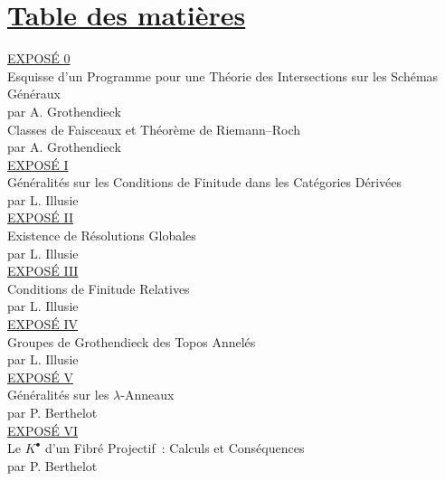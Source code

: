 \section*{\underline{Table des matières}}

\noindent
\underline{EXPOSÉ 0}\\
Esquisse d'un Programme pour une Théorie des Intersections sur les Schémas Généraux\\
par A. Grothendieck \\[8pt]
Classes de Faisceaux et Théorème de Riemann--Roch\\
par A. Grothendieck \\[8pt]
\underline{EXPOSÉ I}\\
Généralités sur les Conditions de Finitude dans les Catégories Dérivées\\
par L. Illusie \\[8pt]
\underline{EXPOSÉ II}\\
Existence de Résolutions Globales\\
par L. Illusie \\[8pt]
\underline{EXPOSÉ III}\\
Conditions de Finitude Relatives\\
par L. Illusie \\[8pt]
\underline{EXPOSÉ IV}\\
Groupes de Grothendieck des Topos Annelés\\
par L. Illusie \\[8pt]
\underline{EXPOSÉ V}\\
Généralités sur les $\lambda$-Anneaux\\
par P. Berthelot \\[8pt]
\underline{EXPOSÉ VI}\\
Le $K^{\bullet}$ d'un Fibré Projectif~: Calculs et Conséquences\\
par P. Berthelot \\[8pt]
